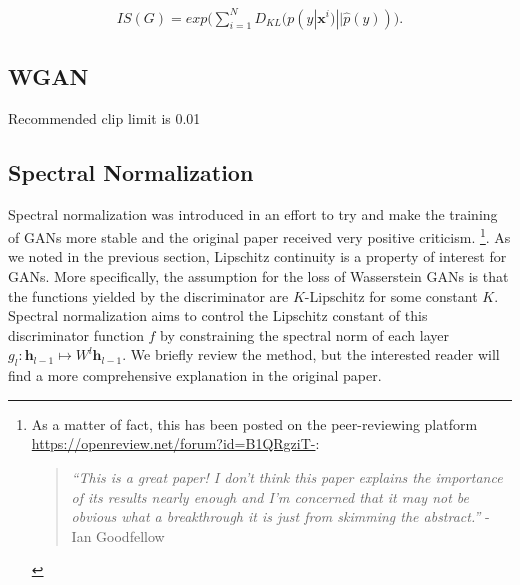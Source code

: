 \begin{equation}
\label{eq_IS2}
\begin{split}
IS(G) = exp\big(\sum^N_{i=1}D_{KL}(p(y|\bm{x}^i)||\hat{p}(y))\big).
\end{split}
\end{equation}


\subsection{WGAN}


Recommended clip limit is 0.01

\subsection{Spectral Normalization}
\label{sec:bg-sn}

Spectral normalization \cite{miyato2018spectral} was introduced in an effort to try and make the training of GANs more stable and the original paper received very positive criticism. \footnote{As a matter of fact, this has been posted on the peer-reviewing platform \url{https://openreview.net/forum?id=B1QRgziT-}:
\begin{quote}
\textit{``This is a great paper! I don't think this paper explains the importance of its results nearly enough and I'm concerned that it may not be obvious what a breakthrough it is just from skimming the abstract.''} - Ian Goodfellow
\end{quote}
}. As we noted in the previous section, Lipschitz continuity is a property of interest for GANs. More specifically, the assumption for the loss of Wasserstein GANs is that the functions yielded by the discriminator are $K$-Lipschitz for some constant $K$. Spectral normalization aims to control the Lipschitz constant of this discriminator function $f$ by constraining the spectral norm of each layer 
$
g_l : \bm{h}_{l-1} \mapsto W^{l} \bm{h}_{l-1}
$. We briefly review the method, but the interested reader will find a more comprehensive explanation in the original paper. 

